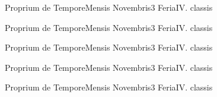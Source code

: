 \documentclass[liber-responsorialis_aestivus.tex]{subfiles}
\begin{document}
	{Proprium de Tempore}{Mensis Novembris}{3}{}
	{Feria}{IV. classis}{}
	{}
	{}

	{Proprium de Tempore}{Mensis Novembris}{3}{}
	{Feria}{IV. classis}{}
	{}
	{}

	{Proprium de Tempore}{Mensis Novembris}{3}{}
	{Feria}{IV. classis}{}
	{}
	{}

	{Proprium de Tempore}{Mensis Novembris}{3}{}
	{Feria}{IV. classis}{}
	{}
	{}

	{Proprium de Tempore}{Mensis Novembris}{3}{}
	{Feria}{IV. classis}{}
	{}
	{}
\end{document}
